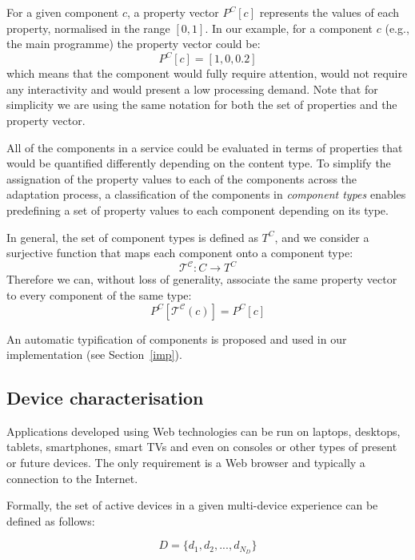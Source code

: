 For a given component $c$, a property vector $P^C[c]$ represents the values of each property, normalised in the range $[0, 1]$.
In our example, for a component $c$ (e.g., the main programme) the property vector could be:
\begin{equation}
P^{C}[c]=[1, 0, 0.2]
\end{equation}
which means that the component would fully require attention, would not require any interactivity and would present a low processing demand.
Note that for simplicity we are using the same notation for both the set of properties and the property vector.

All of the components in a service could be evaluated in terms of properties that would be quantified differently depending on the content type. 
To simplify the assignation of the property values to each of the components across the adaptation process, a classification of the components in \emph{component types} enables predefining a set of property values to each component depending on its type. 

In general, the set of component types is defined as $T^C$, 
and we consider a surjective function that maps each component onto a component type:
\begin{equation}
\mathcal{T^C}:C \to T^C
\end{equation}
Therefore we can, without loss of generality, associate the same property vector to every component of the same type: 
\begin{equation}
P^C[\mathcal{T^C}(c)] = P^C[c]
\end{equation}

An automatic typification of components is proposed and used in our implementation (see Section~\ref{imp}).

\subsection{Device characterisation} \label{devices}

Applications developed using Web technologies can be run on laptops, desktops, tablets, smartphones, smart TVs and even on consoles or other types of present or future devices. 
The only requirement is a Web browser and typically a connection to the Internet. 

Formally, the set of active devices in a given multi-device experience can be defined as follows:

\begin{equation}
D= \{  d_1, d_2, ..., d_{N_D} \}
\end{equation}

